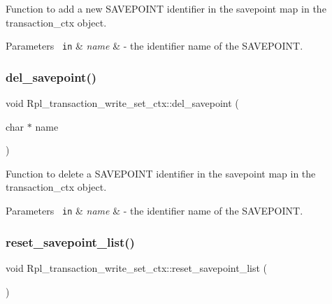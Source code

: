 Function to add a new S\+A\+V\+E\+P\+O\+I\+NT identifier in the savepoint map in the transaction\+\_\+ctx object.


\begin{DoxyParams}[1]{Parameters}
\mbox{\texttt{ in}}  & {\em name} & -\/ the identifier name of the S\+A\+V\+E\+P\+O\+I\+NT. \\
\hline
\end{DoxyParams}
\mbox{\label{classRpl__transaction__write__set__ctx_ab9bb7799dbea3999e441aa53245267a3}} 
\subsubsection{\texorpdfstring{del\+\_\+savepoint()}{del\_savepoint()}}
{\footnotesize\ttfamily void Rpl\+\_\+transaction\+\_\+write\+\_\+set\+\_\+ctx\+::del\+\_\+savepoint (\begin{DoxyParamCaption}\item[{char $\ast$}]{name }\end{DoxyParamCaption})}

Function to delete a S\+A\+V\+E\+P\+O\+I\+NT identifier in the savepoint map in the transaction\+\_\+ctx object.


\begin{DoxyParams}[1]{Parameters}
\mbox{\texttt{ in}}  & {\em name} & -\/ the identifier name of the S\+A\+V\+E\+P\+O\+I\+NT. \\
\hline
\end{DoxyParams}
\mbox{\label{classRpl__transaction__write__set__ctx_a00245209aabac640cbdcbee2b47c865d}} 
\subsubsection{\texorpdfstring{reset\+\_\+savepoint\+\_\+list()}{reset\_savepoint\_list()}}
{\footnotesize\ttfamily void Rpl\+\_\+transaction\+\_\+write\+\_\+set\+\_\+ctx\+::reset\+\_\+savepoint\+\_\+list (\begin{DoxyParamCaption}{ }\end{DoxyParamCaption})}

